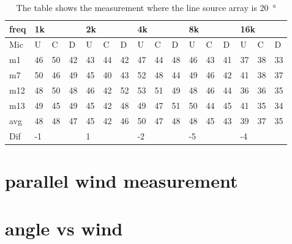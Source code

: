 \begin{table}[H]
\centering
\caption{The table shows the measurement where the line source array is \SI{20}{\degree}}
\begin{tabular}{l|l|l|l|l|l|l|l|l|l|l|l|l|lll}
freq & \multicolumn{3}{l|}{1k} & \multicolumn{3}{l|}{2k} & \multicolumn{3}{l|}{4k} & \multicolumn{3}{l|}{8k} & \multicolumn{3}{l}{16k}                                \\ \hline
Mic  & U      & C      & D     & U      & C      & D     & U      & C      & D     & U      & C      & D     & \multicolumn{1}{l|}{U}  & \multicolumn{1}{l|}{C}  & D  \\ \hline
m1    &46      &  50    &  42    &   43   &  44    &  42    &  47    &   44    &  48    &    46   &  43    &  41    & \multicolumn{1}{l|}{37} & \multicolumn{1}{l|}{38} &33  \\
m7    & 50     &  46    &  49    &   45   &  40    &   43   &   52   &   48    &  44    &    49   & 46     &  42    & \multicolumn{1}{l|}{41} & \multicolumn{1}{l|}{38} &37  \\
m12  & 48     &  50    &  48    &  46    &  42    &   52   &   53   &   51    &   49   &   48    &  46    & 44     & \multicolumn{1}{l|}{36} & \multicolumn{1}{l|}{36} & 35 \\
m13  &  49    &  45    &  49    &  45    &  42    &   48   &   49   &   47    &  51    &   50    &  44    &  45    & \multicolumn{1}{l|}{41} & \multicolumn{1}{l|}{35} & 34 \\ \hline
avg &  48    & 48     &   47   &  45    & 42     &  46    &  50    &  47     &  48    &  48     &   45   & 43     & \multicolumn{1}{l|}{39} & \multicolumn{1}{l|}{37}  &35  \\ \hline  
Dif & \multicolumn{3}{l|}{-1} & \multicolumn{3}{l|}{1} & \multicolumn{3}{l|}{-2} & \multicolumn{3}{l|}{-5} & \multicolumn{3}{l}{-4}                                
\end{tabular}
\end{table}

\section{parallel wind measurement}\label{mes:kudo:par_mes}

\section{angle vs wind}\label{mes:kudo:relaton}